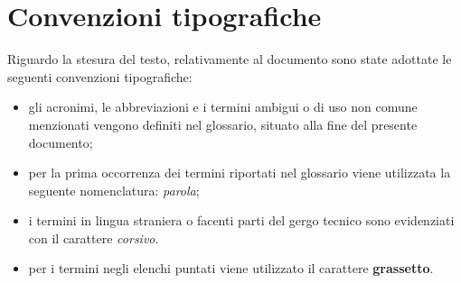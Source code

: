     
    
    
    
    

\section{Convenzioni tipografiche}
\label{sec:convenzioni-tipografiche}

Riguardo la stesura del testo, relativamente al documento sono state adottate le seguenti convenzioni tipografiche:
\begin{itemize}
	\item gli acronimi, le abbreviazioni e i termini ambigui o di uso non comune menzionati vengono definiti nel glossario, situato alla fine del presente documento;
	\item per la prima occorrenza dei termini riportati nel glossario viene utilizzata la seguente nomenclatura: \emph{parola}\glsfirstoccur;
	\item i termini in lingua straniera o facenti parti del gergo tecnico sono evidenziati con il carattere \emph{corsivo}.
	\item per i termini negli elenchi puntati viene utilizzato il carattere \textbf{grassetto}.
\end{itemize}
